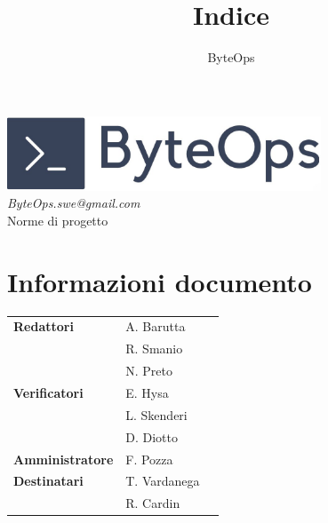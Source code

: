 \documentclass{article}
\title{\textbf{\fontsize{28}{6}\selectfont Indice}}
\author{\fontsize{14}{6}\selectfont ByteOps}
\date{}
\begin{document}
\pagestyle{fancy}
\begin{center}
    \includegraphics[width = 0.7\textwidth]{../Images/logo.png} \\
    \vspace{0.2cm}
    \textcolor[RGB]{60, 60, 60}{\textit{ByteOps.swe@gmail.com}} \\
    \vspace{2cm}
    \fontsize{16}{6}\selectfont Norme di progetto \\
    \vspace{0.5cm}
\end{center}

\section*{Informazioni documento}
\def\arraystretch{1.2}
\begin{tabular}{>{\raggedleft\arraybackslash}p{}|>{\raggedright\arraybackslash}p{}c}
    \hline
    \addlinespace 
    \textbf{Redattori}      & A. Barutta               \\ & R. Smanio \\ & N. Preto \vspace{10pt} \\
    \textbf{Verificatori}   & E. Hysa                  \\ & L. Skenderi \\ & D. Diotto \vspace{10pt} \\
    \textbf{Amministratore} & F. Pozza \vspace{10pt}   \\
    \textbf{Destinatari}    & T. Vardanega             \\ & R. Cardin \vspace{10pt} \\
\end{tabular}
\pagebreak 

\end{document}
